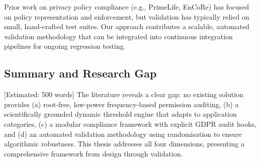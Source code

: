 Prior work on privacy policy compliance (e.g., PrimeLife, EnCoRe) has focused on policy representation and enforcement, but validation has typically relied on small, hand-crafted test suites. Our approach contributes a scalable, automated validation methodology that can be integrated into continuous integration pipelines for ongoing regression testing.

\subsection{Summary and Research Gap} [Estimated: 500 words]
The literature reveals a clear gap: no existing solution provides (a) root-free, low-power frequency-based permission auditing, (b) a scientifically grounded dynamic threshold engine that adapts to application categories, (c) a modular compliance framework with explicit GDPR audit hooks, and (d) an automated validation methodology using randomisation to ensure algorithmic robustness. This thesis addresses all four dimensions, presenting a comprehensive framework from design through validation.